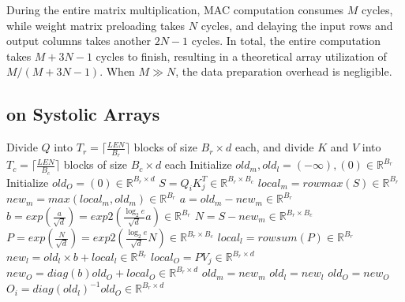 During the entire matrix multiplication, MAC computation consumes $M$ cycles,
while weight matrix preloading takes $N$ cycles,
and delaying the input rows and output columns takes another $2 N - 1$ cycles.
In total, the entire computation takes $M + 3N - 1$ cycles to finish,
resulting in a theoretical array utilization of $M / (M + 3N - 1)$. 
When $M \gg N$, the data preparation overhead is negligible.


\subsection{\FA{} on Systolic Arrays}\label{sec:fa-algorithm}

\begin{algorithm}[t]
    \caption{\FA{}-2 and 3 forward pass}
    \label{alg:flash-attention}
    Divide $Q$ into $T_{r} = \lceil \frac{LEN}{B_{r}} \rceil$ blocks of size $B_{r} \times d$ each,
    and divide $K$ and $V$ into $T_{c} = \lceil \frac{LEN}{B_{c}} \rceil$ blocks of size $B_{c} \times d$ each\;
    {
        Initialize $old_m, old_l = (-\infty), (0) \in \mathbb{R}^{B_{r}} $\;
        Initialize $old_O = (0) \in \mathbb{R}^{B_{r} \times d} $\;
        {
            $ S = Q_{i}K_{j}^{T} \in \mathbb{R}^{B_{r} \times B_{c}} $\; \label{line:mat1}
            $ local_m = rowmax(S) \in \mathbb{R}^{B_{r}} $\; \label{line:rowmax-start}
            $ new_m = max(local_m, old_m) \in \mathbb{R}^{B_{r}} $\; \label{line:new-m}
            $ a = old_m - new_m \in \mathbb{R}^{B_{r}} $\; \label{line:rowmax-end}
            $ b = exp(\frac{a}{\sqrt{d}}) = exp2(\frac{\log_2 e}{\sqrt{d}}a) \in \mathbb{R}^{B_{r}} $\;
            $ N = S - new_m \in \mathbb{R}^{B_{r} \times B_{c}} $\; \label{line:s-minus-rowmax}
            $ P = exp(\frac{N}{\sqrt{d}}) = exp2(\frac{\log_2 e}{\sqrt{d}}N) \in \mathbb{R}^{B_{r} \times B_{c}} $\; \label{line:exp}
            $ local_l = rowsum(P) \in \mathbb{R}^{B_{r}} $\; \label{line:rowsum}
            $ new_l = old_l \times b + local_l \in \mathbb{R}^{B_{r}} $\; \label{line:l-acc}
            $ local_O = PV_{j} \in \mathbb{R}^{B_{r} \times d} $\; \label{line:mat2}
            $ new_O = diag(b)old_O + local_O \in \mathbb{R}^{B_{r} \times d} $\; \label{line:O-acc}
            $ old_m = new_m $\;
            $ old_l = new_l $\;
            $ old_O = new_O $\;
        }
        $ O_{i} = diag(old_l)^{-1}old_O \in \mathbb{R}^{B_{r} \times d} $\; \label{line:re-scaling}
    }
\end{algorithm}

